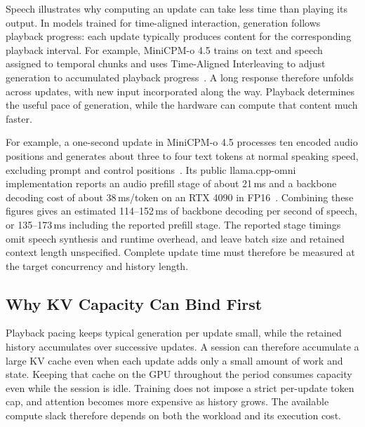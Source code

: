 Speech illustrates why computing an update can take less time than playing its output.
In models trained for time-aligned interaction, generation follows playback progress: each update typically produces content for the corresponding playback interval.
For example, MiniCPM-o 4.5 trains on text and speech assigned to temporal chunks and uses Time-Aligned Interleaving to adjust generation to accumulated playback progress~\cite{cui2026minicpmo45}.
A long response therefore unfolds across updates, with new input incorporated along the way.
Playback determines the useful pace of generation, while the hardware can compute that content much faster.

For example, a one-second update in MiniCPM-o 4.5 processes ten encoded audio positions and generates about three to four text tokens at normal speaking speed, excluding prompt and control positions~\cite{cui2026minicpmo45}.
Its public llama.cpp-omni implementation reports an audio prefill stage of about 21\,ms and a backbone decoding cost of about 38\,ms/token on an RTX 4090 in FP16~\cite{llamacppomni2026readme}.
Combining these figures gives an estimated 114--152\,ms of backbone decoding per second of speech, or 135--173\,ms including the reported prefill stage.
The reported stage timings omit speech synthesis and runtime overhead, and leave batch size and retained context length unspecified.
Complete update time must therefore be measured at the target concurrency and history length.

\subsection{Why KV Capacity Can Bind First}
\label{sec:capacity-problem}
\label{sec:slack-conditions}

Playback pacing keeps typical generation per update small, while the retained history accumulates over successive updates.
A session can therefore accumulate a large KV cache even when each update adds only a small amount of work and state.
Keeping that cache on the GPU throughout the period consumes capacity even while the session is idle.
Training does not impose a strict per-update token cap, and attention becomes more expensive as history grows.
The available compute slack therefore depends on both the workload and its execution cost.

